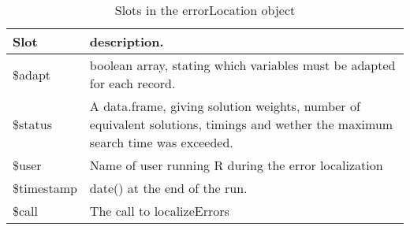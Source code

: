 \begin{table}
\caption{Slots in the {\sf errorLocation} object}
\label{tblErrorLocation}
\begin{tabular}{lp{}}
\hline
Slot          & description. \\
\hline
{\sf \$adapt} & boolean array, stating which variables must be adapted for each record.\\
{\sf \$status}& A {\sf data.frame}, giving solution weights, number of equivalent solutions, timings and wether the maximum search time was exceeded.\\
{\sf \$user}  & Name of user running R during the error localization\\
{\sf \$timestamp} & {\sf date()} at the end of the run.\\
{\sf \$call}  & The call to {\sf localizeErrors}\\
\hline
\end{tabular}
\end{table}
